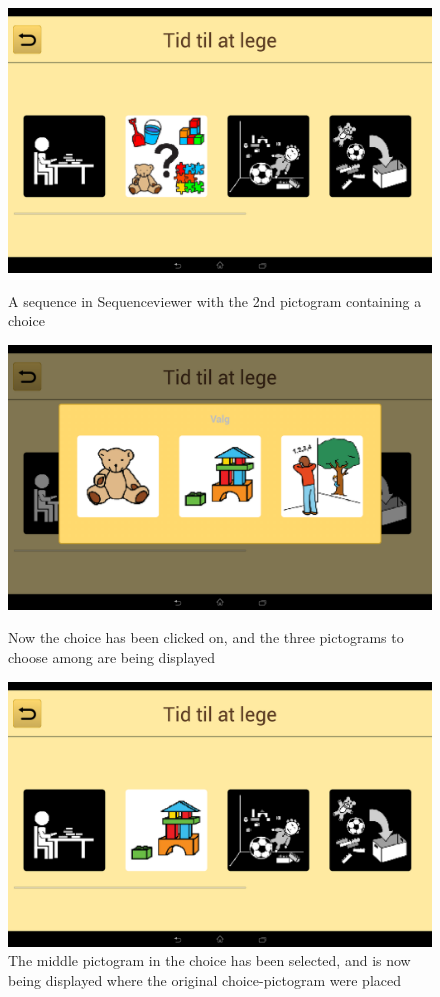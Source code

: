 \begin{figure}[H]
	\centering
	\includegraphics[scale=0.15]{Pics/Sprint4/choice1noBtn.png}
	\caption{A sequence in Sequenceviewer with the 2nd pictogram containing a choice}
	\label{fig:choicepic1}
	
	\includegraphics[scale=0.15]{Pics/Sprint4/choice2noBtn.png}
	\caption{Now the choice has been clicked on, and the three pictograms to choose among are being displayed}
	\label{fig:choicepic2}
	
	\includegraphics[scale=0.15]{Pics/Sprint4/choice3noBtn.png}
	\caption{The middle pictogram in the choice has been selected, and is now being displayed where the original choice-pictogram were placed}
	\label{fig:choicepic3}
\end{figure}


